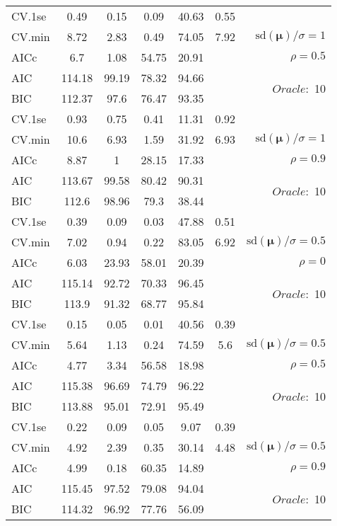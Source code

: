 \begin{table}
\begin{center}
\begin{tabular}{l*{5}{c}|r}
 \hline 
CV.1se & 0.49 & 0.15 & 0.09 & 40.63 & 0.55 & \\
CV.min & 8.72 & 2.83 & 0.49 & 74.05 & 7.92 &  $\mathrm{sd}(\mathbf{\mu})/\sigma=1$ \\
AICc & 6.7 & 1.08 & 54.75 & 20.91 & & $\rho=0.5$ \\
AIC & 114.18 & 99.19 & 78.32 & 94.66 & &  \multirow{2}{*}{$Oracle: $ 10} \\
BIC & 112.37 & 97.6 & 76.47 & 93.35 & &  \\
 \hline 
CV.1se & 0.93 & 0.75 & 0.41 & 11.31 & 0.92 & \\
CV.min & 10.6 & 6.93 & 1.59 & 31.92 & 6.93 &  $\mathrm{sd}(\mathbf{\mu})/\sigma=1$ \\
AICc & 8.87 & 1 & 28.15 & 17.33 & & $\rho=0.9$ \\
AIC & 113.67 & 99.58 & 80.42 & 90.31 & &  \multirow{2}{*}{$Oracle: $ 10} \\
BIC & 112.6 & 98.96 & 79.3 & 38.44 & &  \\
 \hline 
CV.1se & 0.39 & 0.09 & 0.03 & 47.88 & 0.51 & \\
CV.min & 7.02 & 0.94 & 0.22 & 83.05 & 6.92 &  $\mathrm{sd}(\mathbf{\mu})/\sigma=0.5$ \\
AICc & 6.03 & 23.93 & 58.01 & 20.39 & & $\rho=0$ \\
AIC & 115.14 & 92.72 & 70.33 & 96.45 & &  \multirow{2}{*}{$Oracle: $ 10} \\
BIC & 113.9 & 91.32 & 68.77 & 95.84 & &  \\
 \hline 
CV.1se & 0.15 & 0.05 & 0.01 & 40.56 & 0.39 & \\
CV.min & 5.64 & 1.13 & 0.24 & 74.59 & 5.6 &  $\mathrm{sd}(\mathbf{\mu})/\sigma=0.5$ \\
AICc & 4.77 & 3.34 & 56.58 & 18.98 & & $\rho=0.5$ \\
AIC & 115.38 & 96.69 & 74.79 & 96.22 & &  \multirow{2}{*}{$Oracle: $ 10} \\
BIC & 113.88 & 95.01 & 72.91 & 95.49 & &  \\
 \hline 
CV.1se & 0.22 & 0.09 & 0.05 & 9.07 & 0.39 & \\
CV.min & 4.92 & 2.39 & 0.35 & 30.14 & 4.48 &  $\mathrm{sd}(\mathbf{\mu})/\sigma=0.5$ \\
AICc & 4.99 & 0.18 & 60.35 & 14.89 & & $\rho=0.9$ \\
AIC & 115.45 & 97.52 & 79.08 & 94.04 & &  \multirow{2}{*}{$Oracle: $ 10} \\
BIC & 114.32 & 96.92 & 77.76 & 56.09 & &  \\
 \hline 
\end{tabular}
\end{center}
\vspace{-1cm}
\end{table}






